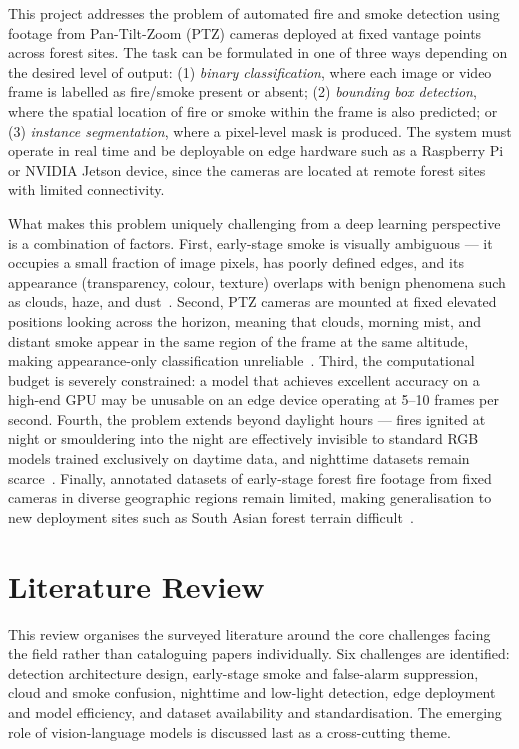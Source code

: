 \documentclass[11pt,twocolumn]{article}
\begin{document}
This project addresses the problem of
automated fire and smoke detection using footage from Pan-Tilt-Zoom
(PTZ) cameras deployed at fixed vantage points across forest sites.
The task can be formulated in one of three ways depending on the
desired level of output: (1) \textit{binary classification}, where
each image or video frame is labelled as fire/smoke present or absent;
(2) \textit{bounding box detection}, where the spatial location of
fire or smoke within the frame is also predicted; or (3)
\textit{instance segmentation}, where a pixel-level mask is produced.
The system must operate in real time and be deployable on edge hardware
such as a Raspberry Pi or NVIDIA Jetson device, since the cameras are
located at remote forest sites with limited connectivity.

What makes this problem uniquely challenging from a deep learning
perspective is a combination of factors. First, early-stage smoke is
visually ambiguous --- it occupies a small fraction of image pixels,
has poorly defined edges, and its appearance (transparency, colour,
texture) overlaps with benign phenomena such as clouds, haze, and
dust~\cite{wildfire2023}. Second, PTZ cameras are mounted at fixed
elevated positions looking across the horizon, meaning that clouds,
morning mist, and distant smoke appear in the same region of the frame
at the same altitude, making appearance-only classification
unreliable~\cite{benchmarking2024}. Third, the computational budget
is severely constrained: a model that achieves excellent accuracy on a
high-end GPU may be unusable on an edge device operating at 5--10
frames per second. Fourth, the problem extends beyond daylight hours
--- fires ignited at night or smouldering into the night are
effectively invisible to standard RGB models trained exclusively on
daytime data, and nighttime datasets remain
scarce~\cite{bouguettaya2022}. Finally, annotated datasets of
early-stage forest fire footage from fixed cameras in diverse geographic
regions remain limited, making generalisation to new deployment sites
such as South Asian forest terrain difficult~\cite{datasets20years}.

\section{Literature Review}
\label{sec:litreview}

This review organises the surveyed literature around the core challenges
facing the field rather than cataloguing papers individually.
Six challenges are identified: detection architecture design,
early-stage smoke and false-alarm suppression, cloud and smoke
confusion, nighttime and low-light detection, edge deployment and
model efficiency, and dataset availability and standardisation.
The emerging role of vision-language models is discussed last as a
cross-cutting theme.
\end{document}
